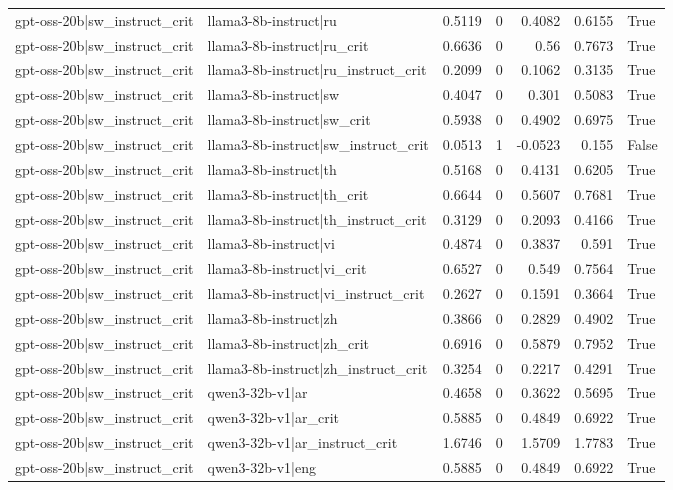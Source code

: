 \begin{table}
\begin{tabular}{l l r r r r l}
gpt-oss-20b|sw_instruct_crit & llama3-8b-instruct|ru & 0.5119 & 0 & 0.4082 & 0.6155 & True \\
gpt-oss-20b|sw_instruct_crit & llama3-8b-instruct|ru_crit & 0.6636 & 0 & 0.56 & 0.7673 & True \\
gpt-oss-20b|sw_instruct_crit & llama3-8b-instruct|ru_instruct_crit & 0.2099 & 0 & 0.1062 & 0.3135 & True \\
gpt-oss-20b|sw_instruct_crit & llama3-8b-instruct|sw & 0.4047 & 0 & 0.301 & 0.5083 & True \\
gpt-oss-20b|sw_instruct_crit & llama3-8b-instruct|sw_crit & 0.5938 & 0 & 0.4902 & 0.6975 & True \\
gpt-oss-20b|sw_instruct_crit & llama3-8b-instruct|sw_instruct_crit & 0.0513 & 1 & -0.0523 & 0.155 & False \\
gpt-oss-20b|sw_instruct_crit & llama3-8b-instruct|th & 0.5168 & 0 & 0.4131 & 0.6205 & True \\
gpt-oss-20b|sw_instruct_crit & llama3-8b-instruct|th_crit & 0.6644 & 0 & 0.5607 & 0.7681 & True \\
gpt-oss-20b|sw_instruct_crit & llama3-8b-instruct|th_instruct_crit & 0.3129 & 0 & 0.2093 & 0.4166 & True \\
gpt-oss-20b|sw_instruct_crit & llama3-8b-instruct|vi & 0.4874 & 0 & 0.3837 & 0.591 & True \\
gpt-oss-20b|sw_instruct_crit & llama3-8b-instruct|vi_crit & 0.6527 & 0 & 0.549 & 0.7564 & True \\
gpt-oss-20b|sw_instruct_crit & llama3-8b-instruct|vi_instruct_crit & 0.2627 & 0 & 0.1591 & 0.3664 & True \\
gpt-oss-20b|sw_instruct_crit & llama3-8b-instruct|zh & 0.3866 & 0 & 0.2829 & 0.4902 & True \\
gpt-oss-20b|sw_instruct_crit & llama3-8b-instruct|zh_crit & 0.6916 & 0 & 0.5879 & 0.7952 & True \\
gpt-oss-20b|sw_instruct_crit & llama3-8b-instruct|zh_instruct_crit & 0.3254 & 0 & 0.2217 & 0.4291 & True \\
gpt-oss-20b|sw_instruct_crit & qwen3-32b-v1|ar & 0.4658 & 0 & 0.3622 & 0.5695 & True \\
gpt-oss-20b|sw_instruct_crit & qwen3-32b-v1|ar_crit & 0.5885 & 0 & 0.4849 & 0.6922 & True \\
gpt-oss-20b|sw_instruct_crit & qwen3-32b-v1|ar_instruct_crit & 1.6746 & 0 & 1.5709 & 1.7783 & True \\
gpt-oss-20b|sw_instruct_crit & qwen3-32b-v1|eng & 0.5885 & 0 & 0.4849 & 0.6922 & True \\

\end{tabular}
\end{table}
